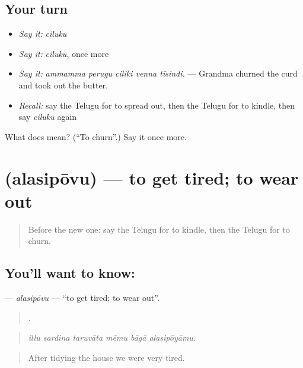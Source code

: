 \subsection*{Your turn}
\begin{itemize}
\raggedright
  \item \emph{Say it:} \emph{ciluku}
  \item \emph{Say it:} \emph{ciluku}, once more
  \item \emph{Say it:} \emph{ammamma perugu ciliki venna tīsindi.} — Grandma churned the curd and took out the butter.
  \item \emph{Recall:} say the Telugu for to spread out, then the Telugu for to kindle, then say \emph{ciluku} again
\end{itemize}

\begin{tcolorbox}[breakable,colback=teal!4,colframe=teal!35!black,title={Before you move on}]
What does  mean? (\textquotedblleft{}To churn\textquotedblright{}.) Say it once more.
\end{tcolorbox}
\section[\texorpdfstring{\te{అలసిపోవు} (alasipōvu)}{అలసిపోవు (alasipōvu)}]{ (alasipōvu) — to get tired; to wear out}

\label{lesson:TE-C549-alasipovu}



\begin{quote}
Before the new one: say the Telugu for to kindle, then the Telugu for to churn.
\end{quote}

\subsection*{You'll want to know: }
\textbf{} — \emph{alasipōvu} — \textquotedblleft{}to get tired; to wear out\textquotedblright{}.

\begin{quote}
     .
\end{quote}

\begin{quote}
\emph{illu sardina taruvāta mēmu bāgā alasipōyāmu.}
\end{quote}

\begin{quote}
After tidying the house we were very tired.
\end{quote}

